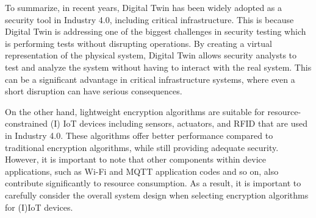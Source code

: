 To summarize, in recent years, Digital Twin has been widely adopted as a security tool in Industry 4.0, including critical infrastructure. This is because Digital Twin is addressing one of the biggest challenges in security testing which is performing tests without disrupting operations. By creating a virtual representation of the physical system, Digital Twin allows security analysts to test and analyze the system without having to interact with the real system. This can be a significant advantage in critical infrastructure systems, where even a short disruption can have serious consequences.

On the other hand, lightweight encryption algorithms are suitable for resource-constrained (I) IoT devices including sensors, actuators, and RFID that are used in Industry 4.0. These algorithms offer better performance compared to traditional encryption algorithms, while still providing adequate security. However, it is important to note that other components within device applications, such as Wi-Fi and MQTT application codes and so on, also contribute significantly to resource consumption. As a result, it is important to carefully consider the overall system design when selecting encryption algorithms for (I)IoT devices.

